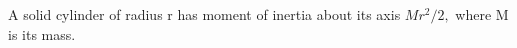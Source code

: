  A solid cylinder of radius r has moment of inertia about its axis $Mr^{2}/2,$  where M is its mass.
